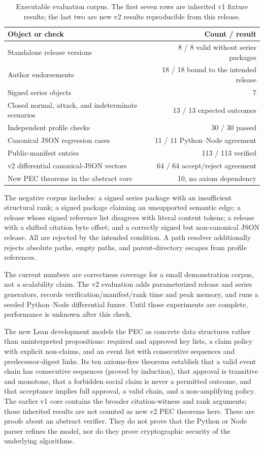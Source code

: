 \documentclass[11pt]{article}
\begin{document}
\begin{table}[t]
\centering
\caption{Executable evaluation corpus. The first seven rows are inherited v1 fixture results; the last two are new v2 results reproducible from this release.}
\begin{tabular}{lr}
\toprule
Object or check & Count / result \\
\midrule
Standalone release versions & 8 / 8 valid without series packages \\
Author endorsements & 18 / 18 bound to the intended release \\
Signed series objects & 7 \\
Closed normal, attack, and indeterminate scenarios & 13 / 13 expected outcomes \\
Independent profile checks & 30 / 30 passed \\
Canonical JSON regression cases & 11 / 11 Python--Node agreement \\
Public-manifest entries & 113 / 113 verified \\
v2 differential canonical-JSON vectors & 64 / 64 accept/reject agreement \\
New PEC theorems in the abstract core & 10, no axiom dependency \\
\bottomrule
\end{tabular}
\end{table}

The negative corpus includes: a signed series package with an insufficient structural rank; a signed package claiming an unsupported semantic edge; a release whose signed reference list disagrees with literal content tokens; a release with a shifted citation byte offset; and a correctly signed but non-canonical JSON release. All are rejected by the intended condition. A path resolver additionally rejects absolute paths, empty paths, and parent-directory escapes from profile references.

The current numbers are correctness coverage for a small demonstration corpus,
not a scalability claim. The v2 evaluation adds parameterized release and
series generators, records verification/manifest/rank time and peak memory,
and runs a seeded Python--Node differential fuzzer. Until those experiments
are complete, performance is unknown after this check.

The new Lean development models the PEC as concrete data structures rather than uninterpreted propositions: required and approved key lists, a claim policy with explicit non-claims, and an event list with consecutive sequences and predecessor-digest links. Its ten axioms-free theorems establish that a valid event chain has consecutive sequences (proved by induction), that approval is transitive and monotone, that a forbidden social claim is never a permitted outcome, and that acceptance implies full approval, a valid chain, and a non-amplifying policy. The earlier v1 core
contains the broader citation-witness and rank arguments; those inherited
results are not counted as new v2 PEC theorems here. These are proofs about an
abstract verifier. They do not prove that the Python or Node parser refines the
model, nor do they prove cryptographic security of the underlying algorithms.
\end{document}
